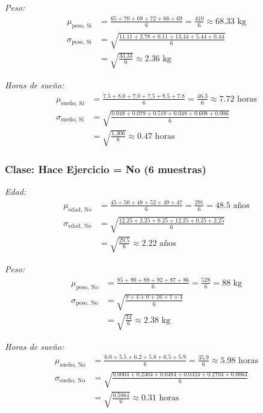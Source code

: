 \documentclass[12pt]{article}
\begin{document}
\textit{Peso:}
\begin{align*}
\mu_{\text{peso, Sí}} &= \frac{65 + 70 + 68 + 72 + 66 + 69}{6} = \frac{410}{6} \approx 68.33 \text{ kg} \\
\sigma_{\text{peso, Sí}} &= \sqrt{\frac{11.11 + 2.78 + 0.11 + 13.44 + 5.44 + 0.44}{6}} \\
&= \sqrt{\frac{33.33}{6}} \approx 2.36 \text{ kg}
\end{align*}

\textit{Horas de sueño:}
\begin{align*}
\mu_{\text{sueño, Sí}} &= \frac{7.5 + 8.0 + 7.0 + 7.5 + 8.5 + 7.8}{6} = \frac{46.3}{6} \approx 7.72 \text{ horas} \\
\sigma_{\text{sueño, Sí}} &= \sqrt{\frac{0.048 + 0.078 + 0.518 + 0.048 + 0.608 + 0.006}{6}} \\
&= \sqrt{\frac{1.306}{6}} \approx 0.47 \text{ horas}
\end{align*}

\subsubsection{Clase: Hace Ejercicio = No (6 muestras)}

\textit{Edad:}
\begin{align*}
\mu_{\text{edad, No}} &= \frac{45 + 50 + 48 + 52 + 49 + 47}{6} = \frac{291}{6} = 48.5 \text{ años} \\
\sigma_{\text{edad, No}} &= \sqrt{\frac{12.25 + 2.25 + 0.25 + 12.25 + 0.25 + 2.25}{6}} \\
&= \sqrt{\frac{29.5}{6}} \approx 2.22 \text{ años}
\end{align*}

\textit{Peso:}
\begin{align*}
\mu_{\text{peso, No}} &= \frac{85 + 90 + 88 + 92 + 87 + 86}{6} = \frac{528}{6} = 88 \text{ kg} \\
\sigma_{\text{peso, No}} &= \sqrt{\frac{9 + 4 + 0 + 16 + 1 + 4}{6}} \\
&= \sqrt{\frac{34}{6}} \approx 2.38 \text{ kg}
\end{align*}

\textit{Horas de sueño:}
\begin{align*}
\mu_{\text{sueño, No}} &= \frac{6.0 + 5.5 + 6.2 + 5.8 + 6.5 + 5.9}{6} = \frac{35.9}{6} \approx 5.98 \text{ horas} \\
\sigma_{\text{sueño, No}} &= \sqrt{\frac{0.0004 + 0.2304 + 0.0484 + 0.0324 + 0.2704 + 0.0064}{6}} \\
&= \sqrt{\frac{0.5884}{6}} \approx 0.31 \text{ horas}
\end{align*}
\end{document}
